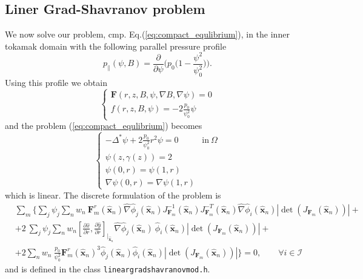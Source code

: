 \subsection{Liner Grad-Shavranov problem}
We now solve our problem, cmp. Eq.(\ref{eq:compact_equlibrium}), in the inner tokamak domain with the following parallel pressure profile
\begin{equation}
  p_{\|}(\psi,B)=\frac{\partial}{\partial\psi}\bigg(p_0\big(1-\frac{\psi^2}{\psi_0^2}\big)\bigg).
\end{equation}
Using this profile we obtain
\begin{equation}
  \begin{cases}
    \mathbf{F}(r,z,B,\psi,\nabla B, \nabla\psi)=0\\
     f(r,z,B,\psi)=-2\frac{p_0}{\psi^2_0}\psi
  \end{cases}
\end{equation}
and the problem (\ref{eq:compact_equlibrium}) becomes
\begin{equation}
  \begin{cases}
    -\Delta^*\psi+2\frac{p_0}{\psi^2_0}r^2\psi=0 & \mathrm{in}\:\Omega\\
    \psi(z,\gamma(z))=2\\
    \psi(0,r)=\psi(1,r)\\
    \nabla\psi(0,r)=\nabla\psi(1,r)
  \end{cases}
\end{equation}
which is linear. The discrete formulation of the problem is
\begin{equation}
  \begin{split}
    &\sum_m \bigg\{\sum_j \psi_j \sum_n w_n\:\mathbf{F}_m^r(\mathbf{\hat{x}}_n)\hat{\nabla}\hat{\phi}_j(\mathbf{\hat{x}}_n)J_{\mathbf{F}_m}^{-1}(\mathbf{\hat{x}}_n)J_{\mathbf{F}_m}^{-T}(\mathbf{\hat{x}}_n)\hat{\nabla}\hat{\phi}_i(\mathbf{\hat{x}}_n)|\det(J_{\mathbf{F}_m}(\mathbf{\hat{x}}_n))| +\\
    &+2\:\sum_j\psi_j\sum_n w_n[\frac{\partial\hat{x}}{\partial r},\frac{\partial\hat{y}}{\partial r}]_{\big|_{\mathbf{\hat{x}}_n}}\hat{\nabla} \hat{\phi}_j(\mathbf{\hat{x}}_n)\:\hat{\phi}_i(\mathbf{\hat{x}}_n)|\det(J_{\mathbf{F}_m}(\mathbf{\hat{x}}_n))|+\\
    &+2\sum_n w_n\:\frac{p_0}{\psi^2_0}\mathbf{F}_m^r(\mathbf{\hat{x}}_n)^3 \hat{\phi}_j(\mathbf{\hat{x}}_n)\hat{\phi}_i(\mathbf{\hat{x}}_n)|\det(J_{\mathbf{F}_m}(\mathbf{\hat{x}}_n))|\bigg\}=0, \qquad\forall i\in\mathcal{I}
  \end{split}
\end{equation}
and is defined in the class \verb|lineargradshavranovmod.h|.
\medskip


